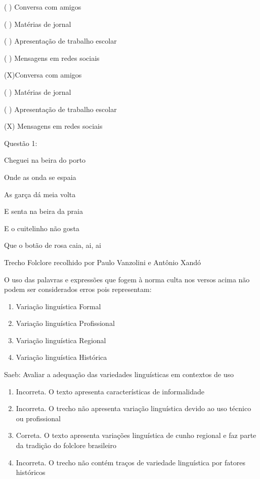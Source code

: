 {\begin{itemize}
\begin{itemize}
( ) Conversa com amigos

( ) Matérias de jornal

( ) Apresentação de trabalho escolar

( ) Mensagens em redes sociais

(X)Conversa com amigos

( ) Matérias de jornal

( ) Apresentação de trabalho escolar

(X) Mensagens em redes sociais


Questão 1:

Cheguei na beira do porto

Onde as onda se espaia

As garça dá meia volta

E senta na beira da praia

E o cuitelinho não gosta

Que o botão de rosa caia, ai, ai

Trecho Folclore recolhido por Paulo Vanzolini e Antônio Xandó

O uso das palavras e expressões que fogem à norma culta nos versos acima
não podem ser considerados erros pois representam:

\begin{enumerate}
\def\labelenumi{\alph{enumi})}
\item
  Variação linguística Formal
\item
  Variação linguística Profissional
\item
  Variação linguística Regional
\item
  Variação linguística Histórica
\end{enumerate}

Saeb: Avaliar a adequação das variedades linguísticas em contextos de
uso

\begin{enumerate}
\def\labelenumi{\arabic{enumi}.}
\item
  Incorreta. O texto apresenta características de informalidade
\item
  Incorreta. O trecho não apresenta variação linguística devido ao uso
  técnico ou profissional
\item
  Correta. O texto apresenta variações linguística de cunho regional e
  faz parte da tradição do folclore brasileiro
\item
  Incorreta. O trecho não contém traços de variedade linguística por
  fatores históricos
\end{enumerate}


\end{itemize}
\end{itemize}}
